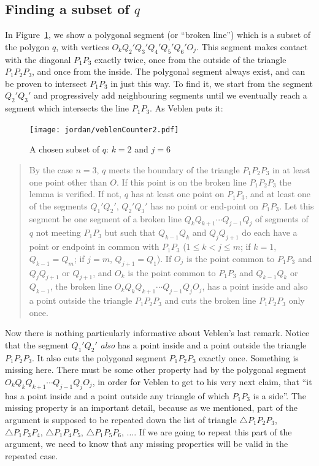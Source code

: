 \subsection{Finding a subset of $q$}\label{sec:SubsetOfQ}
In Figure~\ref{fig:VeblenCounter2}, we show a polygonal segment  (or ``broken line'') which is a subset of the polygon $q$, with vertices $O_kQ_2'Q_3'Q_4'Q_5'Q_6'O_j$. This segment makes contact with the diagonal $P_1P_3$ exactly twice, once from the outside of the triangle $P_1P_2P_3$, and once from the inside. The polygonal segment always exist, and can be proven to intersect $P_1P_3$ in just this way. To find it, we start from the segment $Q_2'Q_3'$ and progressively add neighbouring segments until we eventually reach a segment which intersects the line $P_1P_3$. As Veblen puts it:

\begin{figure}
\centering
\texttt{[image: jordan/veblenCounter2.pdf]}
\caption{A chosen subset of $q$: $k=2$ and $j=6$}
\label{fig:VeblenCounter2}
\end{figure}

\begin{quote}By the case $n=3$, $q$ meets the boundary of the triangle $P_1P_2P_3$ in at least one point other than $O$. If this point is on the broken line $P_1P_2P_3$ the lemma is verified. If not, $q$ has at least one point on $P_1P_3$, and at least one of the segments $Q_1'Q_2'$, $Q_2'Q_3'$ has no point or end-point on $P_1P_3$. Let this segment be one segment of a broken line $Q_kQ_{k+1}\cdots Q_{j-1}Q_j$ of segments of $q$ not meeting $P_1P_3$ but such that $Q_{k-1}Q_k$ and $Q_jQ_{j+1}$ do each have a point or endpoint in common with $P_1P_3$ ($1 \leq k < j \leq m$; if $k = 1$, $Q_{k-1} = Q_m$; if $j = m$, $Q_{j+1} = Q_1$). If $O_j$ is the point common to $P_1P_3$ and $Q_jQ_{j+1}$ or $Q_{j+1}$, and $O_k$ is the point common to $P_1P_3$ and $Q_{k-1}Q_k$ or $Q_{k-1}$, the broken line $O_kQ_kQ_{k+1}\cdots Q_{j-1}Q_jO_j$, has a point inside and also a point outside the triangle $P_1P_2P_3$ and cuts the broken line $P_1P_2P_3$ only once. \end{quote}

Now there is nothing particularly informative about Veblen's last remark. Notice that the segment $Q_1'Q_2'$ \emph{also} has a point inside and a point outside the triangle $P_1P_2P_3$. It also cuts the polygonal segment $P_1P_2P_3$ exactly once. Something is missing here. There must be some other property had by the polygonal segment $O_kQ_kQ_{k+1}\cdots Q_{j-1}Q_jO_j$, in order for Veblen to get to his very next claim, that ``it has a point inside and a point outside any triangle of which $P_1P_3$ is a side''. The missing property is an important detail, because as we mentioned, part of the argument is supposed to be repeated down the list of triangle $\triangle P_1P_2P_3$, $\triangle P_1P_3P_4$, $\triangle P_1P_4P_5$, $\triangle P_1P_5P_6$, $\ldots$. If we are going to repeat this part of the argument, we need to know that any missing properties will be valid in the repeated case.

